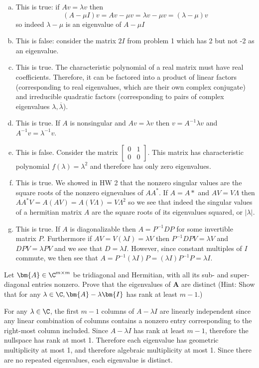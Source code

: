 \documentclass[letter, 12pt]{article}
\begin{document}
\begin{enumerate}[(a)]
\item This is true: if $Av=\lambda v$ then
\[
(A-\mu I)v = Av - \mu v = \lambda v - \mu v = (\lambda-\mu)v
\]
so indeed $\lambda-\mu$ is an eigenvalue of $A-\mu I$
\item This is false: consider the matrix $2I$ from problem 1 which has 2 but not -2 as an eigenvalue.
\item This is true. The characteristic polynomial of a real matrix must have real coefficients. Therefore, it can be factored into a product of linear factors (corresponding to real eigenvalues, which are their own complex conjugate) and irreducible quadratic factors (corresponding to pairs of complex eigenvalues $\lambda,\overline{\lambda}$).
\item This is true. If $A$ is nonsingular and $Av=\lambda v$ then $v = A^{-1}\lambda v$ and $A^{-1}v = \lambda^{-1}v$.
\item This is false. Consider the matrix $\begin{bmatrix} 0 & 1 \\ 0 & 0\end{bmatrix}$. This matrix has characteristic polynomial $f(\lambda) = \lambda^2$ and therefore has only zero eigenvalues.
\item This is true. We showed in HW 2 that the nonzero singular values are the square roots of the nonzero eignevalues of $AA^*$. If $A=A*$ and $AV=V\Lambda$ then $AA^*V = A(AV) = A(V\Lambda) = V\Lambda^2$ so we see that indeed the singular values of a hermitian matrix $A$ are the square roots of its eigenvalues squared, or $|\lambda|$.
\item This is true. If $A$ is diagonalizable then $A=P^{-1}DP$ for some invertible matrix $P$. Furthermore if $AV=V(\lambda I) = \lambda V$ then $P^{-1}DP V = \lambda V$ and $DPV = \lambda PV$ and we see that $D=\lambda I$. However, since constant multiples of $I$ commute, we then see that $A=P^{-1}(\lambda I)P = (\lambda I)P^{-1}P = \lambda I$. 
\end{enumerate}

\begin{problem}[]
Let $\bm{A}\in\C^{m\times m}$ be tridiagonal and Hermitian, with all its sub- and super-diagonal entries nonzero. Prove that the eigenvalues of $\bm{A}$ are distinct (Hint: Show that for any $\lambda\in\C,\bm{A}-\lambda\bm{I}$ has rank at least $m-1$.)
\end{problem}
For any $\lambda\in \C$, the first $m-1$ columns of $A-\lambda I$ are linearly independent since any linear combination of columns contains a nonzero entry corresponding to the right-most column included. Since $A-\lambda I$ has rank at least $m-1$, therefore the nullspace has rank at most 1. Therefore each eigenvalue has geometric multiplicity at most 1, and therefore algebraic multiplicity at most 1. Since there are no repeated eigenvalues, each eigenvalue is distinct.

\pagebreak
\end{document}
